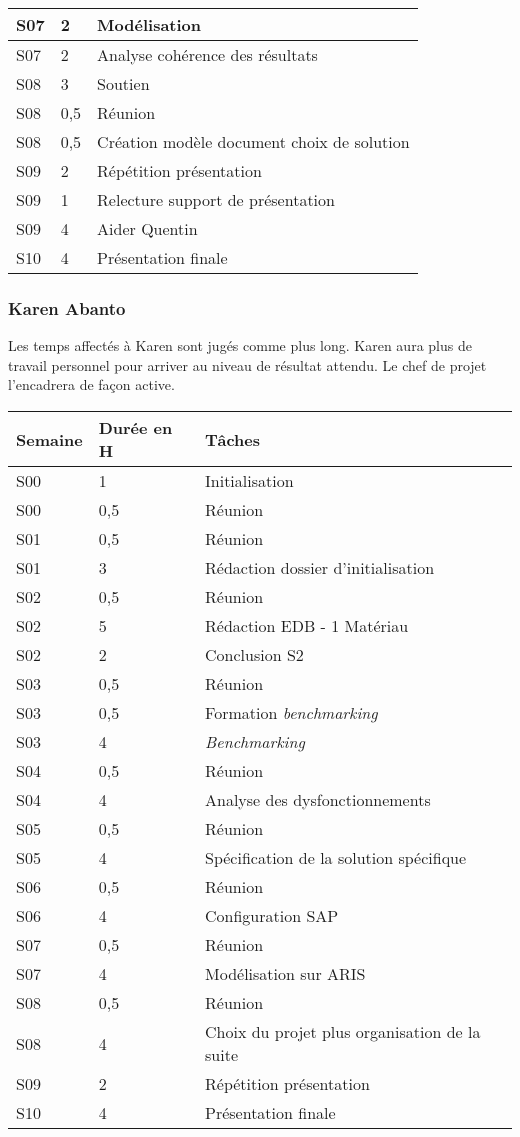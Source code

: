 \begin{longtable}{|l|l|l|}
\hline
S07&2&Modélisation\\
\hline
S07&2&Analyse cohérence des résultats\\
\hline
S08&3&Soutien\\
\hline
S08&0,5&Réunion\\
\hline
S08&0,5&Création modèle document choix de solution\\
\hline
S09&2&Répétition présentation\\
\hline
S09&1&Relecture support de présentation\\
\hline
S09&4&Aider Quentin\\
\hline
S10&4&Présentation finale\\
\hline
\end{longtable}

\pagebreak
\subsubsection{Karen Abanto}

Les temps affectés à Karen sont jugés comme plus long. Karen aura plus de travail
personnel pour arriver au niveau de résultat attendu. 
Le chef de projet l'encadrera de façon active.

\begin{longtable}{|l|l|l|}
\hline
Semaine&Durée en H&Tâches\\
\hline
S00&1&Initialisation\\
\hline
S00&0,5&Réunion\\
\hline
S01&0,5&Réunion\\
\hline
S01&3&Rédaction dossier d'initialisation\\
\hline
S02&0,5&Réunion\\
\hline
S02&5&Rédaction EDB - 1 Matériau\\
\hline
S02&2&Conclusion S2\\
\hline
S03&0,5&Réunion\\
\hline
S03&0,5&Formation \textsl{benchmarking}\\
\hline
S03&4&\textsl{Benchmarking}\\
\hline
S04&0,5&Réunion\\
\hline
S04&4&Analyse des dysfonctionnements\\
\hline
S05&0,5&Réunion\\
\hline
S05&4&Spécification de la solution spécifique\\
\hline
S06&0,5&Réunion\\
\hline
S06&4&Configuration SAP\\
\hline
S07&0,5&Réunion\\
\hline
S07&4&Modélisation sur ARIS\\
\hline
S08&0,5&Réunion\\
\hline
S08&4&Choix du projet plus organisation de la suite\\
\hline
S09&2&Répétition présentation\\
\hline
S10&4&Présentation finale\\
\hline
\end{longtable}


